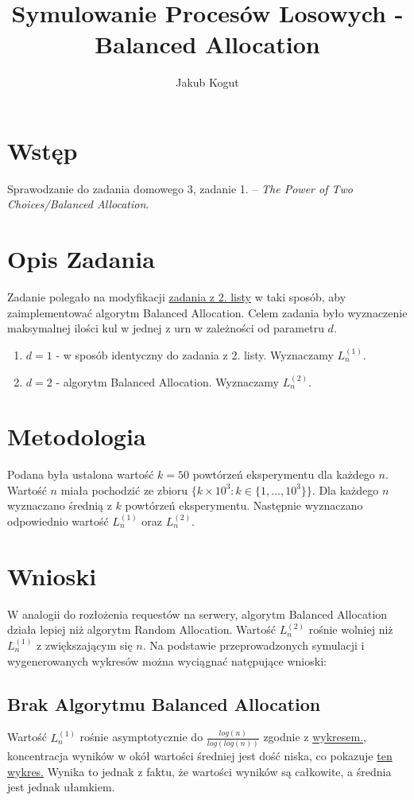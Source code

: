 \documentclass{article}
\title{Symulowanie Procesów Losowych - Balanced Allocation}
\author{Jakub Kogut}
\date{}
\begin{document}
\maketitle

\section{Wstęp}
Sprawodzanie do zadania domowego 3, zadanie 1. -- \textit{The Power of Two Choices/Balanced Allocation}.
\section{Opis Zadania}
Zadanie polegało na modyfikacji \href{https://github.com/niooch/ballsAndBins}{zadania z 2. listy} w taki sposób, aby zaimplementować algorytm Balanced Allocation. \newline
Celem zadania było wyznaczenie maksymalnej ilości kul w jednej z urn w zależności od parametru $d$.
\begin{enumerate}
    \item $d=1$ - w sposób identyczny do zadania z 2. listy. Wyznaczamy $L_n^{(1)}$.
    \item $d=2$ - algorytm Balanced Allocation. Wyznaczamy $L_n^{(2)}$.
\end{enumerate}
\section{Metodologia}
Podana była ustalona wartość $k=50$ powtórzeń eksperymentu dla każdego $n$. Wartość $n$ miała pochodzić ze zbioru $\{k \times 10^3: k \in \{1, ..., 10^3\}\}$. Dla każdego $n$ wyznaczano średnią z $k$ powtórzeń eksperymentu. Następnie wyznaczano odpowiednio wartość $L_n^{(1)}$ oraz $L_n^{(2)}$.
\section{Wnioski}
W analogii do rozłożenia requestów na serwery, algorytm Balanced Allocation działa lepiej niż algorytm Random Allocation. Wartość $L_n^{(2)}$ rośnie wolniej niż $L_n^{(1)}$ z zwiększającym się $n$. \newline
Na podstawie przeprowadzonych symulacji i wygenerowanych wykresów można wyciągnać natępujące wnioski:
\subsection{Brak Algorytmu Balanced Allocation}
Wartość $L_n^{(1)}$ rośnie asymptotycznie do $\frac{log(n)}{log(log(n))}$ zgodnie z \hyperref[fig:Ln1]{wykresem.}, koncentracja wyników w okół wartości średniej jest dość niska, co pokazuje \hyperref[fig:LnA]{ten wykres.} Wynika to jednak z faktu, że wartości wyników są całkowite, a średnia jest jednak ułamkiem.
\end{document}
